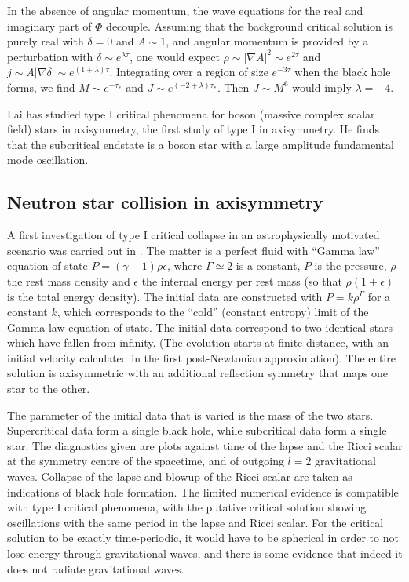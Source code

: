 \documentclass{article}
\begin{document}
In the absence of angular momentum, the wave equations for the real
and imaginary part of $\Phi$ decouple. Assuming that the background
critical solution is purely real with $\delta=0$ and $A\sim 1$, and
angular momentum is provided by a perturbation with $\delta\sim
e^{\lambda\tau}$, one would expect $\rho\sim|\nabla A|^2\sim
e^{2\tau}$ and $j\sim A|\nabla\delta| \sim
e^{(1+\lambda)\tau}$. Integrating over a region of size $e^{-3\tau}$
when the black hole forms, we find $M\sim e^{-\tau_*}$ and $J\sim
e^{(-2+\lambda)\tau_*}$. Then $J\sim M^6$ would imply $\lambda= -4$.

Lai \cite{Lai} has studied type I critical phenomena for boson
(massive complex scalar field) stars in axisymmetry, the first study
of type I in axisymmetry. He finds that the subcritical endstate is a
boson star with a large amplitude fundamental mode oscillation.


\subsection{Neutron star collision in axisymmetry}

A first investigation of type I critical collapse in an
astrophysically motivated scenario was carried out in
\cite{JinSuen}. The matter is a perfect fluid with ``Gamma law''
equation of state $P=(\gamma-1)\rho\epsilon$, where $\Gamma\simeq 2$
is a constant, $P$ is the pressure, $\rho$ the rest mass density and
$\epsilon$ the internal energy per rest mass (so that
$\rho(1+\epsilon)$ is the total energy density). The initial data are
constructed with $P=k\rho^\Gamma$ for a constant $k$, which
corresponds to the ``cold'' (constant entropy) limit of the Gamma law
equation of state. The initial data correspond to two identical stars
which have fallen from infinity. (The evolution starts at finite
distance, with an initial velocity calculated in the first
post-Newtonian approximation). The entire solution is axisymmetric
with an additional reflection symmetry that maps one star to the other. 

The parameter of the initial data that is varied is the mass of the
two stars. Supercritical data form a single black hole, while
subcritical data form a single star. The diagnostics given are plots
against time of the lapse and the Ricci scalar at the symmetry centre
of the spacetime, and of outgoing $l=2$ gravitational waves. Collapse
of the lapse and blowup of the Ricci scalar are taken as indications
of black hole formation. The limited numerical evidence is
compatible with type I critical phenomena, with the putative critical
solution showing oscillations with the same period in the lapse and
Ricci scalar. For the critical solution to be exactly time-periodic,
it would have to be spherical in order to not lose energy through
gravitational waves, and there is some evidence that indeed it does
not radiate gravitational waves.
\end{document}
